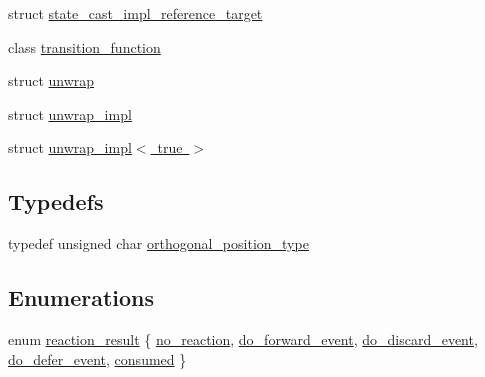\begin{DoxyCompactItemize}
\item 
struct \mbox{\hyperlink{structboost_1_1statechart_1_1detail_1_1state__cast__impl__reference__target}{state\+\_\+cast\+\_\+impl\+\_\+reference\+\_\+target}}
\item 
class \mbox{\hyperlink{classboost_1_1statechart_1_1detail_1_1transition__function}{transition\+\_\+function}}
\item 
struct \mbox{\hyperlink{structboost_1_1statechart_1_1detail_1_1unwrap}{unwrap}}
\item 
struct \mbox{\hyperlink{structboost_1_1statechart_1_1detail_1_1unwrap__impl}{unwrap\+\_\+impl}}
\item 
struct \mbox{\hyperlink{structboost_1_1statechart_1_1detail_1_1unwrap__impl_3_01true_01_4}{unwrap\+\_\+impl$<$ true $>$}}
\end{DoxyCompactItemize}
\subsection*{Typedefs}
\begin{DoxyCompactItemize}
\item 
typedef unsigned char \mbox{\hyperlink{namespaceboost_1_1statechart_1_1detail_a3bedea0b807a16fa222733417183d2c9}{orthogonal\+\_\+position\+\_\+type}}
\end{DoxyCompactItemize}
\subsection*{Enumerations}
\begin{DoxyCompactItemize}
\item 
enum \mbox{\hyperlink{namespaceboost_1_1statechart_1_1detail_ab091bbb4c29327fb46ee479ea1b7255b}{reaction\+\_\+result}} \{ \newline
\mbox{\hyperlink{namespaceboost_1_1statechart_1_1detail_ab091bbb4c29327fb46ee479ea1b7255ba4d86205de715a9babe60227df2fd0d13}{no\+\_\+reaction}}, 
\mbox{\hyperlink{namespaceboost_1_1statechart_1_1detail_ab091bbb4c29327fb46ee479ea1b7255ba4df2d08ea5b8ab72baf5ca9a98eaa8df}{do\+\_\+forward\+\_\+event}}, 
\mbox{\hyperlink{namespaceboost_1_1statechart_1_1detail_ab091bbb4c29327fb46ee479ea1b7255badd0f566df1a7b78d7db8c72fbfcb00a3}{do\+\_\+discard\+\_\+event}}, 
\mbox{\hyperlink{namespaceboost_1_1statechart_1_1detail_ab091bbb4c29327fb46ee479ea1b7255bae217591a2ca5982361b667f3a7865f95}{do\+\_\+defer\+\_\+event}}, 
\newline
\mbox{\hyperlink{namespaceboost_1_1statechart_1_1detail_ab091bbb4c29327fb46ee479ea1b7255bac26ab9d8d80f4ebadd553d4c8ee851c8}{consumed}}
 \}
\end{DoxyCompactItemize}
